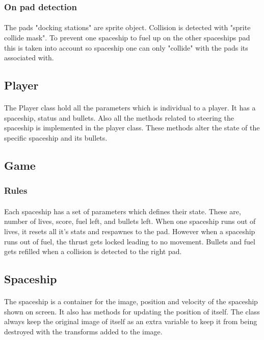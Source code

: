 \documentclass{article}
\begin{document}
\subsubsection{On pad detection}
\paragraph{}
The pads "docking stations" are sprite object. Collision is detected with "sprite collide mask". To prevent one spaceship to fuel up on the other spaceships pad this is taken into account so spaceship one can only "collide" with the pads its associated with. 
\subsection{Player}
\paragraph{}
The Player class hold all the parameters which is individual to a player. It has a spaceship, status and bullets. Also all the methods related to steering the spaceship is implemented in the player class. These methods alter the state of the specific spaceship and its bullets.
\paragraph{}
\subsection{Game}
\subsubsection{Rules}
\paragraph{}
Each spaceship has a set of parameters which defines their state. These are, number of lives, score, fuel left, and bullets left. When one spaceship runs out of lives, it resets all it's stats and respawnes to the pad. However when a spaceship runs out of fuel, the thrust gets locked leading to no movement. Bullets and fuel gets refilled when a collision is detected to the right pad.
\subsection{Spaceship}
\paragraph{}
The spaceship is a container for the image, position and velocity of the spaceship shown on screen. It also has methods for updating the position of itself. The class always keep the original image of itself as an extra variable to keep it from being destroyed with the transforms added to the image.
\end{document}
